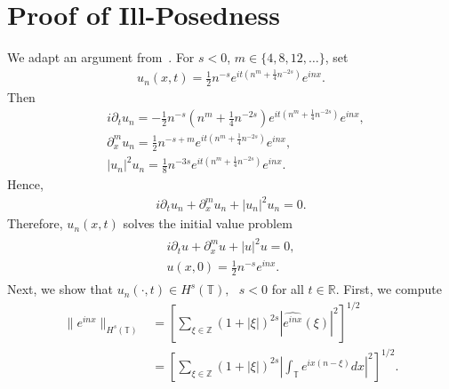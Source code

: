 \documentclass[12pt,reqno]{amsart}
\numberwithin{equation}{section}  %
\numberwithin{figure}{section}
\newcommand{\rr}{\mathbb{R}}
\newcommand{\zz}{\mathbb{Z}}
\newcommand{\ci}{\mathbb{T}}
\newcommand{\wh}{\widehat}
\newcommand{\p}{\partial}
\theoremstyle{plain}
\theoremstyle{definition}
\theoremstyle{remark}
\begin{document}
\section{Proof of Ill-Posedness}
We adapt an argument from~\cite{Burq_Gerad_Tzvetkov-An-instability-}. For $s<0$,
$m \in \{4, 8, 12, \dots\}$, set
%
%
%
%
\begin{equation}
	\label{ill-soln}
	\begin{split}
		u_{n}(x,t)=\frac{1}{2 }n^{-s}e^{it\left( n^{m}+\frac{1}{4}n^{-2s}
		\right)}e^{inx}.
	\end{split}
\end{equation}
%
%
Then
%
%
\begin{equation*}
	\begin{split}
		& i \p_t u_{n}
		= -\frac{1}{2 }n^{-s}\left( n^{m}+\frac{1}{4}n^{-2s} \right)e^{it\left(
		n^{m}+ \frac{1}{4}n^{-2s} \right)}e^{inx},
		\\
		& \p_x^{m}u_{n}  = \frac{1}{2 }n^{-s+m}e^{it\left(
		n^{m}+\frac{1}{4}n^{-2s} \right)}e^{inx},
		\\
		& | u_{n} |^{2}u_{n}  = \frac{1}{8 }n^{-3s}e^{it\left(
		n^{m}+\frac{1}{4}n^{-2s} \right)}e^{inx}.
	\end{split}
\end{equation*}
%
%
Hence,
%
%
\begin{equation*}
	\begin{split}
		i \p_t u_{n} + \p_x^{m}u_{n} + | u_{n} |^{2} u_{n}
		=0.
	\end{split}
\end{equation*}
%
%
Therefore, $u_{n}(x,t)$ solves the initial value problem
%
%
\begin{gather*}
	\begin{split}
		i \p_t u + \p_x^m u + | u |^{2}u = 0,
		\\
    u(x,0) = \frac{1}{2 }n^{-s}e^{inx}.
	\end{split}
\end{gather*}
%
%
Next, we show that $u_{n}(\cdot, t) \in H^{s}(\ci), \text{ } s < 0$ for all $t
\in \rr$.  First, we compute
%
%
\begin{equation*}
	\begin{split}
		\|e^{inx}\|_{H^{s}(\ci)}
		& =  \left[ \sum_{\xi \in \zz} \left( 1+ | \xi |
		\right)^{2s} | \wh{e^{inx}}(\xi) |^{2} \right]^{1/2}
		\\
		& =  \left[ \sum_{\xi \in \zz} \left( 1 + | \xi | \right)^{2s} |
		\int_{\ci}e^{ix(n- \xi)}dx |^{2}\right]^{1/2}.
	\end{split}
\end{equation*}
\end{document}
